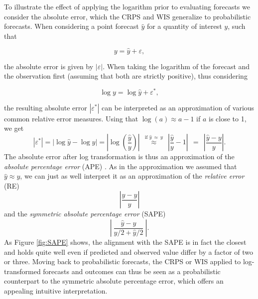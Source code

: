 \documentclass{article}
\begin{document}
To illustrate the effect of applying the logarithm prior to evaluating forecasts we consider the absolute error, which the CRPS and WIS generalize to probabilistic forecasts. When considering a point forecast $\hat{y}$ for a quantity of interest $y$, such that 
%
\begin{linenomath*}
\begin{equation*}
y = \hat{y} + \varepsilon,
\end{equation*}
\end{linenomath*}
the absolute error is given by $|\varepsilon|$. When taking the logarithm of the forecast and the observation first (assuming that both are strictly positive), thus considering 
\begin{linenomath*}
\begin{equation*}
\log y = \log \hat{y} + \varepsilon^*,
\end{equation*}
\end{linenomath*}
the resulting absolute error $\left|\varepsilon^*\right|$ can be interpreted as an approximation of various common relative error measures. Using that $\log(a) \approx a - 1$ if $a$ is close to 1, we get
$$
|\varepsilon^*| = |\log \hat{y} - \log y| = \left|\log\left(\frac{\hat{y}}{y}\right) \right| \ \ \stackrel{\text{if } \hat{y} \ \approx \ y}{\approx} \ \ \left| \frac{\hat{y}}{y} - 1 \right| \ \ = \ \ \left| \frac{\hat{y} - y}{y} \right|.
$$
The absolute error after log transformation is thus an approximation of the \textit{absolute percentage error} (APE) \cite{Gneiting2011JASA}. As in the approximation we assumed that $\hat{y} \approx y$, we can just as well interpret it as an approximation of the \textit{relative error} (RE)
$$
\left| \frac{\hat{y} - y}{\hat{y}} \right|
$$
and the \textit{symmetric absolute percentage error} (SAPE)
$$
\left| \ \frac{\hat{y} - y}{y/2 + \hat{y}/2} \ \right|.
$$
As Figure \ref{fig:SAPE} shows, the alignment with the SAPE is in fact the closest and holds quite well even if predicted and observed value differ by a factor of two or three. Moving back to probabilistic forecasts, the CRPS or WIS applied to log-transformed forecasts and outcomes can thus be seen as a probabilistic counterpart to the symmetric absolute percentage error, which offers an appealing intuitive interpretation.
\end{document}
